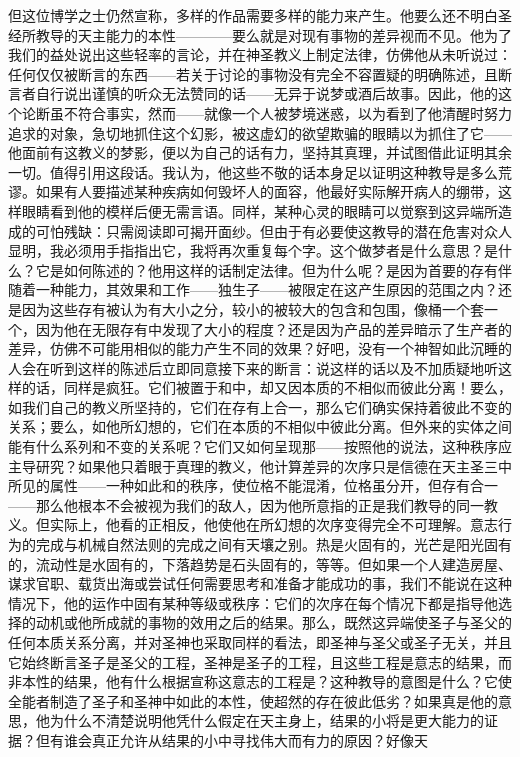 但这位博学之士仍然宣称，多样的作品需要多样的能力来产生。他要么还不明白圣经所教导的天主能力的本性————要么就是对现有事物的差异视而不见。他为了我们的益处说出这些轻率的言论，并在神圣教义上制定法律，仿佛他从未听说过：任何仅仅被断言的东西——若关于讨论的事物没有完全不容置疑的明确陈述，且断言者自行说出谨慎的听众无法赞同的话——无异于说梦或酒后故事。因此，他的这个论断虽不符合事实，然而——就像一个人被梦境迷惑，以为看到了他清醒时努力追求的对象，急切地抓住这个幻影，被这虚幻的欲望欺骗的眼睛以为抓住了它——他面前有这教义的梦影，便以为自己的话有力，坚持其真理，并试图借此证明其余一切。值得引用这段话。我认为，他这些不敬的话本身足以证明这种教导是多么荒谬。如果有人要描述某种疾病如何毁坏人的面容，他最好实际解开病人的绷带，这样眼睛看到他的模样后便无需言语。同样，某种心灵的眼睛可以觉察到这异端所造成的可怕残缺：只需阅读即可揭开面纱。但由于有必要使这教导的潜在危害对众人显明，我必须用手指指出它，我将再次重复每个字。这个做梦者是什么意思？是什么？它是如何陈述的？他用这样的话制定法律。但为什么呢？是因为首要的存有伴随着一种能力，其效果和工作——独生子——被限定在这产生原因的范围之内？还是因为这些存有被认为有大小之分，较小的被较大的包含和包围，像桶一个套一个，因为他在无限存有中发现了大小的程度？还是因为产品的差异暗示了生产者的差异，仿佛不可能用相似的能力产生不同的效果？好吧，没有一个神智如此沉睡的人会在听到这样的陈述后立即同意接下来的断言：说这样的话以及不加质疑地听这样的话，同样是疯狂。它们被置于和中，却又因本质的不相似而彼此分离！要么，如我们自己的教义所坚持的，它们在存有上合一，那么它们确实保持着彼此不变的关系；要么，如他所幻想的，它们在本质的不相似中彼此分离。但外来的实体之间能有什么系列和不变的关系呢？它们又如何呈现那——按照他的说法，这种秩序应主导研究？如果他只着眼于真理的教义，他计算差异的次序只是信德在天主圣三中所见的属性——一种如此和的秩序，使位格不能混淆，位格虽分开，但存有合一——那么他根本不会被视为我们的敌人，因为他所意指的正是我们教导的同一教义。但实际上，他看的正相反，他使他在所幻想的次序变得完全不可理解。意志行为的完成与机械自然法则的完成之间有天壤之别。热是火固有的，光芒是阳光固有的，流动性是水固有的，下落趋势是石头固有的，等等。但如果一个人建造房屋、谋求官职、载货出海或尝试任何需要思考和准备才能成功的事，我们不能说在这种情况下，他的运作中固有某种等级或秩序：它们的次序在每个情况下都是指导他选择的动机或他所成就的事物的效用之后的结果。那么，既然这异端使圣子与圣父的任何本质关系分离，并对圣神也采取同样的看法，即圣神与圣父或圣子无关，并且它始终断言圣子是圣父的工程，圣神是圣子的工程，且这些工程是意志的结果，而非本性的结果，他有什么根据宣称这意志的工程是？这种教导的意图是什么？它使全能者制造了圣子和圣神中如此的本性，使超然的存在彼此低劣？如果真是他的意思，他为什么不清楚说明他凭什么假定在天主身上，结果的小将是更大能力的证据？但有谁会真正允许从结果的小中寻找伟大而有力的原因？好像天